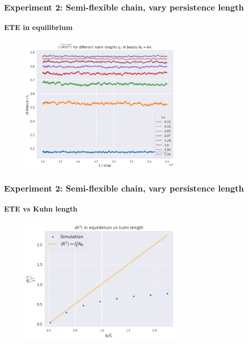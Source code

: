 \documentclass[handout]{beamer}
\begin{document}
\begin{frame}
    \frametitle{Experiment 2: Semi-flexible chain, vary persistence length}
    \framesubtitle{ETE in equilibrium}

    \begin{figure}[h]
        \includegraphics[width=8cm]{./4-exp-R_equi.png}
    \end{figure}
\end{frame}


\begin{frame}
    \frametitle{Experiment 2: Semi-flexible chain, vary persistence length}
    \framesubtitle{ETE vs Kuhn length}

    \begin{figure}[h]
        \includegraphics[width=8cm]{./4-exp-R_sim_vs_theor.png}
    \end{figure}
\end{frame}
\end{document}
